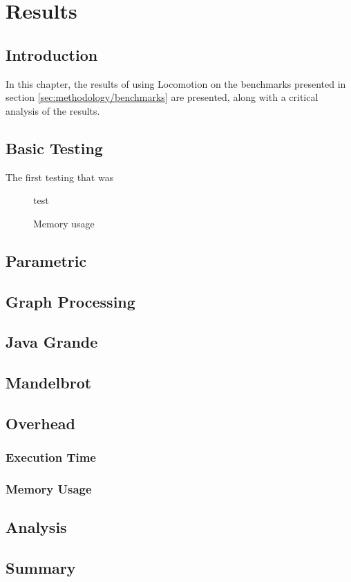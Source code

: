 \chapter{Results} \label{chp:results}
\section{Introduction} \label{sec:results/introduction}
In this chapter, the results of using Locomotion on the benchmarks presented in section \ref{sec:methodology/benchmarks} are presented, along with a critical analysis of the results.

\section{Basic Testing} \label{sec:results/basic}
The first testing that was

\begin{figure}[H]
	\centering
	\begin{gnuplot}[terminal=pdf]
		test
	\end{gnuplot}
\end{figure}

\begin{figure}[H]
	\centering
	\caption{Memory usage}
\end{figure}

\section{Parametric} \label{sec:results/parametric}

\section{Graph Processing} \label{sec:results/graph}

\section{Java Grande} \label{sec:results/grande}

\section{Mandelbrot} \label{sec:results/mandelbrot}

\section{Overhead} \label{sec:results/overhead}
	\subsection{Execution Time} \label{sec:results/overhead/time}
	
	\subsection{Memory Usage} \label{sec:results/overhead/memory}

\section{Analysis} \label{sec:results/analysis}

\section{Summary} \label{sec:results/summary}